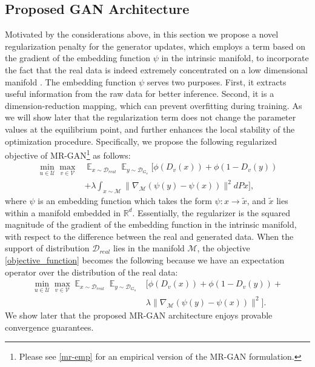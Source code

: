 \documentclass[10pt,twocolumn,letterpaper]{article}
\newcommand{\RR}{\mathbb{R}}
\newcommand{\nn}{\nonumber}
\newcommand{\g}{{G_u}}
\newcommand{\di}{{D_v}}
\newcommand{\U}{\mathcal{U}}
\newcommand{\D}{\mathcal{D}}
\newcommand{\V}{\mathcal{V}}
\newcommand{\E}{\mathbb{E}}
\newcommand{\xt}{{\tilde{x}}}
\newcommand{\M}{\mathcal{M}}
\begin{document}
\subsection{Proposed GAN Architecture}
Motivated by the considerations above, in this section we propose a novel regularization penalty for the
generator updates, which employs a term based on the gradient of the embedding function $\psi$ in the intrinsic manifold, to incorporate the fact that the real data is indeed extremely concentrated on a low dimensional manifold \cite{narayanan2010sample}. The embedding function $\psi$ serves two purposes. First, it extracts useful information from the raw data for better inference. Second, it is a dimension-reduction mapping, which can prevent overfitting during training. {As we will show later that the regularization term does not change the parameter values at the equilibrium point, and further enhances the local stability of the optimization procedure.}  Specifically, we propose the following regularized objective of MR-GAN\footnote{Please see \eqref{mr-emp} for an empirical version of the MR-GAN formulation.} as follows:
\begin{align}\label{objective_function}
\min_{u\in \U} \max_{v\in \V} &\mathop{\E}_{x\sim \D_{real}}\mathop{\E}_{y\sim \D_{\g}}[\phi (\di(x))+ \phi(1-\di(y))
\nn\\&+\lambda \int_{x \sim\M} \|\nabla_\M (\psi(y)-\psi(x))\|^2dPx],
\end{align}
where $\psi$ is an embedding function which takes the form $\psi: x \rightarrow \xt$, and $\xt$ lies within a manifold embedded in $\RR^d$. %
 Essentially, the regularizer is the squared magnitude of the gradient  of the embedding function in the intrinsic manifold, with respect to the difference between the real and generated data. {When the support of distribution $\D_{real}$ lies in the manifold $\M$, the objective \eqref{objective_function} becomes the following because we have an expectation operator over the distribution of the real data:
	\begin{align}\label{problem}
	\min_{u\in \U} \max_{v\in \V} \mathop{\E}_{x\sim \D_{real}}\mathop{\E}_{y\sim \D_{\g}}&[\phi (\di(x))+ \phi(1-\di(y))+\nn\\&
	\lambda \|\nabla_\M (\psi(y)-\psi(x))\|^2].
	\end{align}}
We show later that the proposed MR-GAN architecture enjoys provable convergence guarantees.
\end{document}
